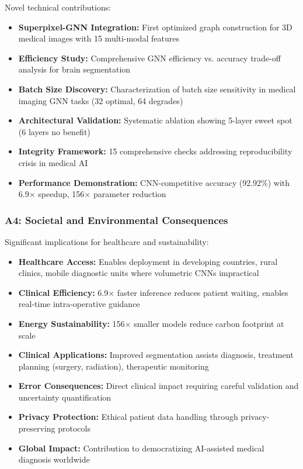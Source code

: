Novel technical contributions:

\begin{itemize}
    \item \textbf{Superpixel-GNN Integration:} First optimized graph construction for 3D medical images with 15 multi-modal features
    \item \textbf{Efficiency Study:} Comprehensive GNN efficiency vs. accuracy trade-off analysis for brain segmentation
    \item \textbf{Batch Size Discovery:} Characterization of batch size sensitivity in medical imaging GNN tasks (32 optimal, 64 degrades)
    \item \textbf{Architectural Validation:} Systematic ablation showing 5-layer sweet spot (6 layers no benefit)
    \item \textbf{Integrity Framework:} 15 comprehensive checks addressing reproducibility crisis in medical AI
    \item \textbf{Performance Demonstration:} CNN-competitive accuracy (92.92\%) with 6.9$\times$ speedup, 156$\times$ parameter reduction
\end{itemize}

\subsubsection*{A4: Societal and Environmental Consequences}

Significant implications for healthcare and sustainability:

\begin{itemize}
    \item \textbf{Healthcare Access:} Enables deployment in developing countries, rural clinics, mobile diagnostic units where volumetric CNNs impractical
    \item \textbf{Clinical Efficiency:} 6.9$\times$ faster inference reduces patient waiting, enables real-time intra-operative guidance
    \item \textbf{Energy Sustainability:} 156$\times$ smaller models reduce carbon footprint at scale
    \item \textbf{Clinical Applications:} Improved segmentation assists diagnosis, treatment planning (surgery, radiation), therapeutic monitoring
    \item \textbf{Error Consequences:} Direct clinical impact requiring careful validation and uncertainty quantification
    \item \textbf{Privacy Protection:} Ethical patient data handling through privacy-preserving protocols
    \item \textbf{Global Impact:} Contribution to democratizing AI-assisted medical diagnosis worldwide
\end{itemize}

